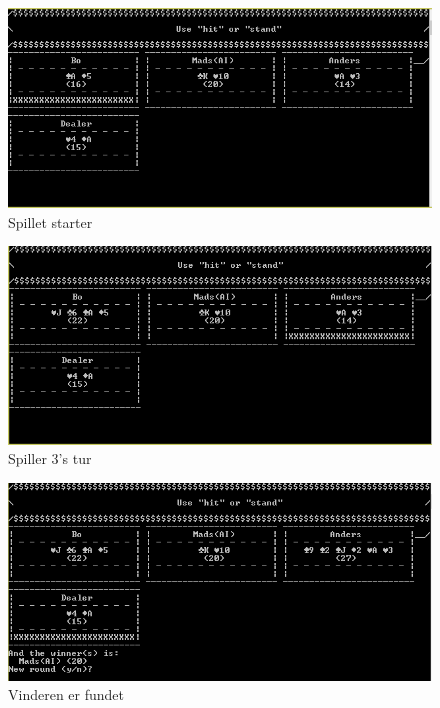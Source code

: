\documentclass[a4paper]{article}
\begin{document}
        \begin{figure}[H]
          \includegraphics{figures/ScoreBoardDealed.PNG}

          \caption{Spillet starter}
          \label{fig:scoreboardDealed}
        \end{figure}

        \begin{figure}[H]
          \includegraphics{figures/Player3Playing.PNG}

          \caption{Spiller 3's tur}
          \label{fig:player3Turn}
        \end{figure}

        \begin{figure}[H]
          \includegraphics{figures/WinnerIs.PNG}

          \caption{Vinderen er fundet}
          \label{fig:winnerIsFound}
        \end{figure}
\end{document}
